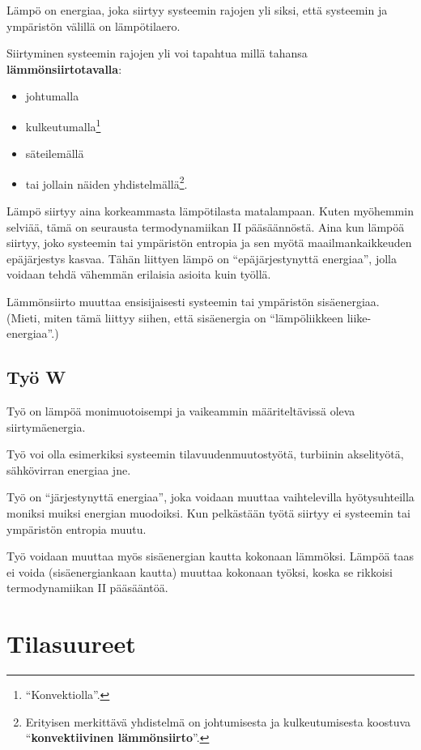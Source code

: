 \documentclass[12pt,a4paper,finnish]{book}
\begin{document}
Lämpö on energiaa, joka siirtyy systeemin rajojen yli siksi, että systeemin ja ympäristön 
välillä on lämpötilaero. 

Siirtyminen systeemin rajojen yli voi tapahtua millä tahansa \textbf{lämmönsiirtotavalla}:

\begin{itemize}
 \item johtumalla
 \item kulkeutumalla\footnote{``Konvektiolla''.}
 \item säteilemällä
 \item tai jollain näiden 
yhdistelmällä\footnote{Erityisen merkittävä yhdistelmä on johtumisesta ja kulkeutumisesta 
koostuva ``\textbf{konvektiivinen lämmönsiirto}''.}.
\end{itemize}

Lämpö siirtyy aina korkeammasta lämpötilasta matalampaan. Kuten myöhemmin selviää, tämä 
on seurausta termodynamiikan II pääsäännöstä. Aina kun lämpöä siirtyy, joko systeemin tai 
ympäristön entropia ja sen myötä maailmankaikkeuden epäjärjestys kasvaa.
Tähän liittyen lämpö on ``epäjärjestynyttä energiaa'', jolla voidaan tehdä vähemmän 
erilaisia asioita kuin työllä.

Lämmönsiirto muuttaa ensisijaisesti systeemin tai ympäristön sisäenergiaa. (Mieti, 
miten tämä liittyy siihen, että sisäenergia on ``lämpöliikkeen liike-energiaa''.)

\section{Työ W}

Työ on lämpöä monimuotoisempi ja vaikeammin määriteltävissä oleva siirtymäenergia. 

Työ voi olla esimerkiksi systeemin tilavuudenmuutostyötä, turbiinin akselityötä, 
sähkövirran energiaa jne.

Työ on ``järjestynyttä energiaa'', joka voidaan muuttaa vaihtelevilla hyötysuhteilla 
moniksi muiksi energian muodoiksi. Kun pelkästään työtä siirtyy ei systeemin tai ympäristön 
entropia muutu.

Työ voidaan muuttaa myös sisäenergian kautta kokonaan lämmöksi. Lämpöä taas ei voida 
(sisäenergiankaan kautta) muuttaa kokonaan työksi, koska se rikkoisi termodynamiikan 
II pääsääntöä.

\chapter{Tilasuureet} \label{chapter:tilasuureet} %
\end{document}
